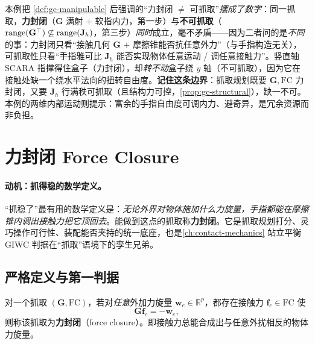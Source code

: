 \begin{insight}\label{ins:gc-scara}
本例把 \cref{def:gc-manipulable} 后强调的“力封闭 $\ne$ 可抓取”\emph{摆成了数字}：同一抓取，\textbf{力封闭}（$\mathbf{G}$ 满射 $+$ 软指内力，第一步）与\textbf{不可抓取}（$\operatorname{range}(\mathbf{G}^\top)\not\subseteq\operatorname{range}(\mathbf{J}_h)$，第三步）\emph{同时}成立，毫不矛盾——因为二者问的是\emph{不同}的事：力封闭只看“接触几何 $\mathbf{G}$ $+$ 摩擦锥能否抗任意外力”（与手指构造无关），可抓取性只看“手指雅可比 $\mathbf{J}_h$ 能否实现物体任意运动 / 调任意接触力”。竖直轴 SCARA 指撑得住盒子（力封闭），却\emph{转不动}盒子绕 $y$ 轴（不可抓取），因为它在接触处缺一个绕水平法向的扭转自由度。\textbf{记住这条边界}：抓取规划既要 $\mathbf{G},\mathrm{FC}$ 力封闭，又要 $\mathbf{J}_h$ 行满秩可抓取（且结构力可控，\cref{prop:gc-structural}），缺一不可。本例的两维内部运动则提示：富余的手指自由度可调内力、避奇异，是冗余资源而非负担。
\end{insight}

\section{力封闭 Force Closure}
\label{sec:gc-forceclosure}

\paragraph{动机：抓得稳的数学定义。}
“抓稳了”最有用的数学定义是：\emph{无论外界对物体施加什么力旋量，手指都能在摩擦锥内调出接触力把它顶回去}。能做到这点的抓取称\textbf{力封闭}。它是抓取规划打分、灵巧操作可行性、装配能否夹持的统一底座，也是\cref{ch:contact-mechanics} 站立平衡 GIWC 判据在“抓取”语境下的孪生兄弟。

\subsection{严格定义与第一判据}
\label{sec:gc-fc-def}

\begin{definition}[力封闭抓取]
\label{def:gc-force-closure}
对一个抓取 $(\mathbf{G},\mathrm{FC})$，若对\emph{任意}外加力旋量 $\mathbf{w}_e\in\mathbb{R}^p$，都存在接触力 $\mathbf{f}_c\in\mathrm{FC}$ 使
\begin{equation}
  \mathbf{G}\mathbf{f}_c=-\mathbf{w}_e,
  \label{eq:gc-fc-def}
\end{equation}
则称该抓取为\textbf{力封闭}（force closure）。即接触力总能合成出与任意外扰相反的物体力旋量。
\end{definition}

